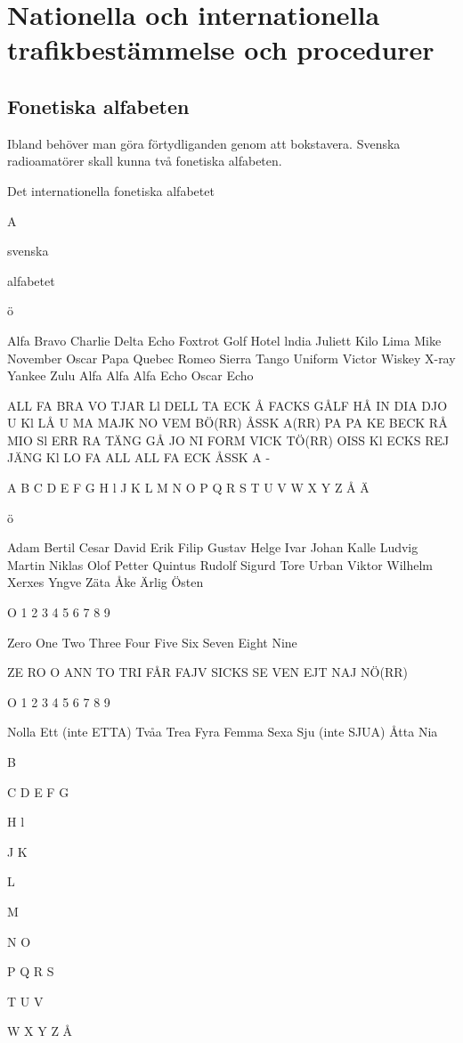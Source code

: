 \chapter{Nationella och internationella trafikbestämmelse och procedurer}

\section{Fonetiska alfabeten}
Ibland behöver man göra förtydliganden genom att bokstavera.
Svenska radioamatörer skall kunna två fonetiska alfabeten.

Det internationella fonetiska alfabetet

A

svenska

alfabetet

ö

Alfa
Bravo
Charlie
Delta
Echo
Foxtrot
Golf
Hotel
lndia
Juliett
Kilo
Lima
Mike
November
Oscar
Papa
Quebec
Romeo
Sierra
Tango
Uniform
Victor
Wiskey
X-ray
Yankee
Zulu
Alfa Alfa
Alfa Echo
Oscar Echo

ALL FA
BRA VO
TJAR Ll
DELL TA
ECK Å
FACKS
GÅLF
HÅ
IN DIA
DJO U
Kl LÅ
U MA
MAJK
NO VEM BÖ(RR)
ÅSSK A(RR)
PA PA
KE BECK
RÅ MIO
Sl ERR RA
TÄNG GÅ
JO NI FORM
VICK TÖ(RR)
OISS Kl
ECKS REJ
JÄNG Kl
LO
FA ALL
ALL FA ECK
ÅSSK A -

A
B
C
D
E
F
G
H
l
J
K
L
M
N
O
P
Q
R
S
T
U
V
W
X
Y
Z
Å
Ä

ö

Adam
Bertil
Cesar
David
Erik
Filip
Gustav
Helge
Ivar
Johan
Kalle
Ludvig
Martin
Niklas
Olof
Petter
Quintus
Rudolf
Sigurd
Tore
Urban
Viktor
Wilhelm
Xerxes
Yngve
Zäta
Åke
Ärlig
Östen

O
1
2
3
4
5
6
7
8
9

Zero
One
Two
Three
Four
Five
Six
Seven
Eight
Nine

ZE RO
O ANN
TO
TRI
FÅR
FAJV
SICKS
SE VEN
EJT
NAJ NÖ(RR)

O
1
2
3
4
5
6
7
8
9

Nolla
Ett (inte ETTA)
Tvåa
Trea
Fyra
Femma
Sexa
Sju (inte SJUA)
Åtta
Nia

B

C
D
E
F
G

H
l

J
K

L

M

N
O

P
Q
R
S

T
U
V

W
X
Y
Z
Å

